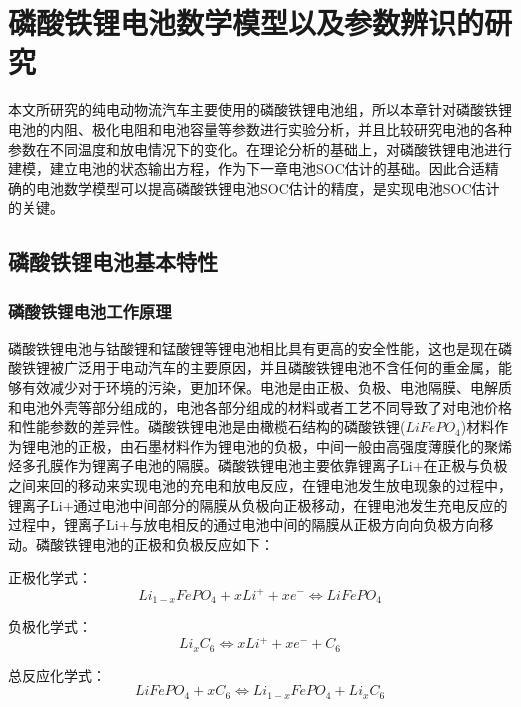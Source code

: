 
\chapter{磷酸铁锂电池数学模型以及参数辨识的研究}
本文所研究的纯电动物流汽车主要使用的磷酸铁锂电池组，所以本章针对磷酸铁锂电池的内阻、极化电阻和电池容量等参数进行实验分析，并且比较研究电池的各种参数在不同温度和放电情况下的变化。在理论分析的基础上，对磷酸铁锂电池进行建模，建立电池的状态输出方程，作为下一章电池SOC估计的基础。因此合适精确的电池数学模型可以提高磷酸铁锂电池SOC估计的精度，是实现电池SOC估计的关键。
\section{磷酸铁锂电池基本特性}
\subsection{磷酸铁锂电池工作原理}
磷酸铁锂电池与钴酸锂和锰酸锂等锂电池相比具有更高的安全性能，这也是现在磷酸铁锂被广泛用于电动汽车的主要原因，并且磷酸铁锂电池不含任何的重金属，能够有效减少对于环境的污染，更加环保。电池是由正极、负极、电池隔膜、电解质和电池外壳等部分组成的，电池各部分组成的材料或者工艺不同导致了对电池价格和性能参数的差异性。磷酸铁锂电池是由橄榄石结构的磷酸铁锂($LiFeP{O_4}$)材料作为锂电池的正极，由石墨材料作为锂电池的负极，中间一般由高强度薄膜化的聚烯烃多孔膜作为锂离子电池的隔膜。磷酸铁锂电池主要依靠锂离子Li+在正极与负极之间来回的移动来实现电池的充电和放电反应，在锂电池发生放电现象的过程中，锂离子Li+通过电池中间部分的隔膜从负极向正极移动，在锂电池发生充电反应的过程中，锂离子Li+与放电相反的通过电池中间的隔膜从正极方向向负极方向移动。磷酸铁锂电池的正极和负极反应如下：

正极化学式：
\begin{equation}
L{i_{1 - x}}FeP{O_4} + xL{i^ + } + x{e^ - } \Leftrightarrow LiFeP{O_4}
\end{equation}

负极化学式：
\begin{equation}
L{i_x}{C_6} \Leftrightarrow xL{i^ + } + x{e^ - } + {C_6}
\end{equation}

总反应化学式：
\begin{equation}
LiFeP{O_4} + x{C_6} \Leftrightarrow L{i_{1 - x}}FeP{O_4} + L{i_x}{C_6}
\end{equation}

